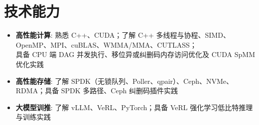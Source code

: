 
\section{技术能力}
\newlength{\HPCSkillIndent}
\begin{itemize}[parsep=0.2ex]
  \item \textbf{高性能计算}: 熟悉 C++、CUDA；了解 C++ 多线程与协程、SIMD、OpenMP、MPI、cuBLAS、WMMA/MMA、CUTLASS；\\
  \hspace*{\HPCSkillIndent}具备 CPU 端 DAG 并发执行、移位异或纠删码内存访问优化及 CUDA SpMM 优化实践
  \item \textbf{高性能存储}: 了解 SPDK（无锁队列、Poller、qpair）、Ceph、NVMe、RDMA；具备 SPDK 多路径、Ceph 纠删码插件实践
  \item \textbf{大模型训推}: 了解 vLLM、VeRL、PyTorch；具备 VeRL 强化学习低比特推理与训练实践
\end{itemize}
